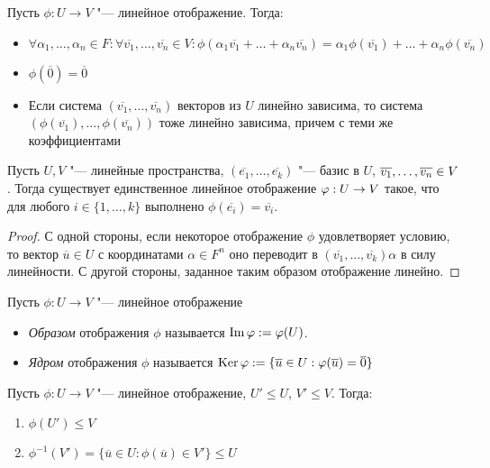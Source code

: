 \begin{note}
	Пусть $\phi: U \to V$ "--- линейное отображение. Тогда:
	\begin{itemize}
		\item $\forall \alpha_1, \dotsc, \alpha_n \in F: \forall \overline{v_1}, \dotsc, \overline{v_n} \in V: \phi(\alpha_1\overline{v_1} + \dots + \alpha_n\overline{v_n}) = \alpha_1\phi(\overline{v_1}) + \dots + \alpha_n\phi(\overline{v_n})$
		\item $\phi(\overline{0}) = \overline{0}$
		\item Если система $(\overline{v_1}, \dots, \overline{v_n})$ векторов из $U$ линейно зависима, то система $(\phi(\overline{v_1}), \dots, \phi(\overline{v_n}))$ тоже линейно зависима, причем с теми же коэффициентами
	\end{itemize}
\end{note}

\begin{proposition}
	Пусть $U, V$ "--- линейные пространства, $(\overline{e_1}, \dots, \overline{e_k})$ "--- базис в $U$, $\overline{v_1}, \dots, \overline{v_n} \hm{\in} V$. Тогда существует единственное линейное отображение $\phi: U \hm{\rightarrow} V$ такое, что для любого $i \in \{1, \dots, k\}$ выполнено $\phi(\overline{e_i}) = \overline{v_i}$.
\end{proposition}

\begin{proof}
	С одной стороны, если некоторое отображение $\phi$ удовлетворяет условию, то вектор $\overline{u} \in U$ с координатами $\alpha \in F^n$ оно переводит в $(\overline{v_1}, \dots, \overline{v_k})\alpha$ в силу линейности. С другой стороны, заданное таким образом отображение линейно.
\end{proof}

\begin{definition}
	Пусть $\phi: U \rightarrow V$ "--- линейное отображение
	\begin{itemize}
		\item \textit{Образом} отображения $\phi$ называется $\operatorname{Im}{\varphi} := \varphi(U)$.
		\item \textit{Ядром} отображения $\phi$ называется $\operatorname{Ker}{\varphi} := \{\overline{u} \in U: \varphi(\overline{u})  = \overline{0}\}$
	\end{itemize}
\end{definition}

\begin{proposition}
	Пусть $\phi: U \rightarrow V$ "--- линейное отображение, $U' \le U$, $V' \le V$. Тогда:
	\begin{enumerate}
		\item $\phi(U') \le V$
		\item $\phi^{-1}(V') = \{\overline{u} \in U: \phi(\overline{u}) \in V'\} \le U$
	\end{enumerate}
\end{proposition}

